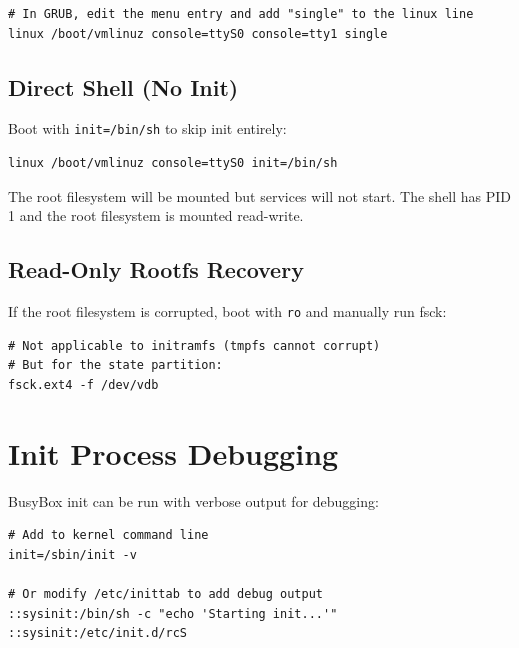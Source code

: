 \begin{lstlisting}
# In GRUB, edit the menu entry and add "single" to the linux line
linux /boot/vmlinuz console=ttyS0 console=tty1 single
\end{lstlisting}

\subsection{Direct Shell (No Init)}

Boot with \texttt{init=/bin/sh} to skip init entirely:

\begin{lstlisting}
linux /boot/vmlinuz console=ttyS0 init=/bin/sh
\end{lstlisting}

The root filesystem will be mounted but services will not start. The
shell has PID 1 and the root filesystem is mounted read-write.

\subsection{Read-Only Rootfs Recovery}

If the root filesystem is corrupted, boot with \texttt{ro} and manually
run fsck:

\begin{lstlisting}
# Not applicable to initramfs (tmpfs cannot corrupt)
# But for the state partition:
fsck.ext4 -f /dev/vdb
\end{lstlisting}

\section{Init Process Debugging}

BusyBox init can be run with verbose output for debugging:

\begin{lstlisting}
# Add to kernel command line
init=/sbin/init -v

# Or modify /etc/inittab to add debug output
::sysinit:/bin/sh -c "echo 'Starting init...'"
::sysinit:/etc/init.d/rcS
\end{lstlisting}
